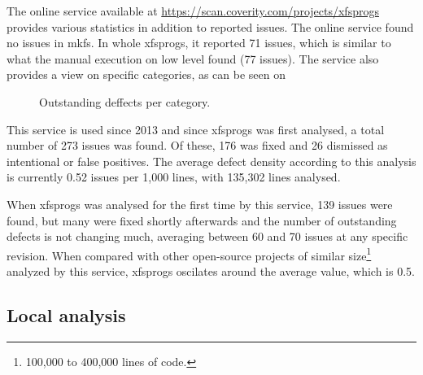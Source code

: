 The online service available at
\url{https://scan.coverity.com/projects/xfsprogs} provides various statistics
in addition to reported issues. The online service found no issues in mkfs. In
whole xfsprogs, it reported 71 issues, which is similar to what the manual
execution on low level found (77 issues). The service also provides a view on
specific categories, as can be seen on 

\begin{figure}
\caption{Outstanding deffects per category.}
\label{fig:results:coverity:defects}
\end{figure}

This service is used since 2013 and since xfsprogs was first analysed, a total
number of 273 issues was found. Of these, 176 was fixed and 26 dismissed as
intentional or false positives. The average defect density according to this
analysis is currently 0.52 issues per 1,000 lines, with 135,302 lines analysed.

When xfsprogs was analysed for the first time by this service, 139 issues were
found, but many were fixed shortly afterwards and the number of outstanding
defects is not changing much, averaging between 60 and 70 issues at any
specific revision. When compared with other open-source projects of similar
size\footnote{100,000 to 400,000 lines of code.} analyzed by this service,
xfsprogs oscilates around the average value, which is 0.5.

\subsection{Local analysis}\label{chap:results:coverity:local}

